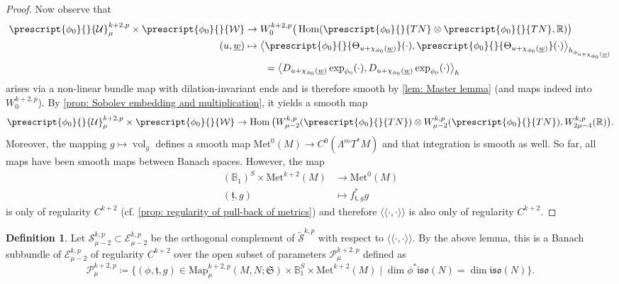 \documentclass{article}
\numberwithin{equation}{section}        %
\theoremstyle{bfnote}
\theoremstyle{definition}
\newtheorem{Def}[thm]{Definition}           %
\theoremstyle{bfremark}
\newcommand{\Ball}{\mathbb{B}}              %
\newcommand{\Map}{\mathrm{Map}}             %
\newcommand{\Met}{\mathrm{Met}}             %
\newcommand{\pairl}{\langle \! \langle}     %
\newcommand{\pairr}{\rangle \! \rangle}     %
\DeclareMathOperator{\vol}{vol}                 %
\DeclareMathOperator{\Hom}{Hom}                 %
\begin{document}
\begin{proof}
    Now observe that 
    \begin{align*}
        \prescript{\phi_0}{}{\mathcal{U}}^{k+2,p}_\mu \times \prescript{\phi_0}{}{\mathcal{W}}  &\to W^{k+2,p}_0\big(\Hom(\prescript{\phi_0}{}{TN}\otimes \prescript{\phi_0}{}{TN},\mathbb{R})\big) \\
        (u,\underline{w}) &\mapsto \big\langle \prescript{\phi_0}{}{\Theta_{u+\chi_{\phi_0}(\underline{w})}}(\cdot),\prescript{\phi_0}{}{\Theta_{u+\chi_{\phi_0}(\underline{w})}}(\cdot) \big\rangle_{h_{\phi_{u+\chi_{\phi_0}(\underline{w})}}} \\
        & \qquad = \big\langle D_{u+\chi_{\phi_0}(\underline{w})} \exp_{\phi_0}(\cdot),D_{u+\chi_{\phi_0}(\underline{w})} \exp_{\phi_0}(\cdot) \big\rangle_{h}
    \end{align*}
    arises via a non-linear bundle map with dilation-invariant ends and is therefore smooth by \cref{lem: Master lemma} (and maps indeed into $W^{k+2,p}_0$). By \cref{prop: Sobolev embedding and multiplication}, it yields a smooth map 
    \begin{equation*}
        \prescript{\phi_0}{}{\mathcal{U}}^{k+2,p}_\mu \times \prescript{\phi_0}{}{\mathcal{W}} \to \Hom\big(W^{k,p}_{\mu-2}(\prescript{\phi_0}{}{TN})\otimes W^{k,p}_{\mu-2}(\prescript{\phi_0}{}{TN}),W^{k,p}_{2\mu-4}(\mathbb{R})\big).
    \end{equation*}
    Moreover, the mapping $g \mapsto \vol_g$ defines a smooth map $\Met^0(M) \to C^{0}(\Lambda^m T^*M)$ and that integration is smooth as well. So far, all maps have been smooth maps between Banach spaces. However, the map 
    \begin{align*}
        (\mathbb{B}_1)^S\times \Met^{k+2}(M) &\to \Met^0(M)\\
        (\underline{\mathfrak{t}},g)&\mapsto f_{\underline{\mathfrak{t}},g}^*g
    \end{align*} 
    is only of regularity $C^{k+2}$ (cf. \cref{prop: regularity of pull-back of metrics}) and therefore $\pairl \cdot,\cdot\pairr$ is also only of regularity $C^{k+2}$.
\end{proof}

\begin{Def}     \label{Def: Banach subbundle}
    Let $\mathcal{S}^{k,p}_{\mu-2} \subset \mathcal{E}^{k,p}_{\mu-2}$ be the orthogonal complement of $\widetilde{\mathcal{S}}^{k,p}$ with respect to $\pairl \cdot,\cdot \pairr$. By the above lemma, this is a Banach subbundle of $\mathcal{E}^{k,p}_{\mu-2}$ of regularity $C^{k+2}$ over the open subset of parameters $\mathcal{P}^{k+2,p}_\mu$ defined as
    \begin{equation*}
        \mathcal{P}^{k+2,p}_\mu \coloneqq \{ (\phi,\underline{\mathfrak{t}},g) \in \Map^{k+2,p}_\mu(M,N;\mathfrak{S}) \times \Ball_1^S \times \Met^{k+2}(M) \mid \dim \phi^* \mathfrak{iso}(N) = \dim \mathfrak{iso}(N) \}.
    \end{equation*}
\end{Def}
\end{document}
